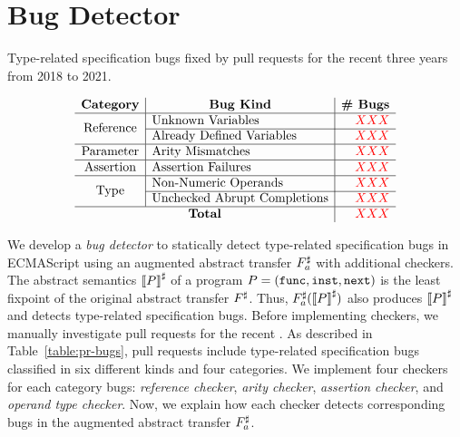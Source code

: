 \section{Bug Detector}\label{sec:checker}

\begin{table}
  \centering
  \caption{Type-related specification bugs fixed by pull requests for the recent
  three years from 2018 to 2021.}
  \label{table:pr-bugs}
  \vspace*{-1.5em}
  \[
    \begin{array}{c|l|r}
      \multicolumn{1}{c}{\textbf{Category}} &
      \multicolumn{1}{|c}{\textbf{Bug Kind}} &
      \multicolumn{1}{|c}{\textbf{\# Bugs}}\\
      \hline

      \multirow{2}{*}{\text{Reference}}
      & \text{Unknown Variables} & \inred{XXX}\\\cline{2-3}
      & \text{Already Defined Variables} & \inred{XXX}\\\hline

      \multirow{1}{*}{\text{Parameter}}
      & \text{Arity Mismatches} & \inred{XXX}\\\hline

      \multirow{1}{*}{\text{Assertion}}
      & \text{Assertion Failures} & \inred{XXX}\\\hline

      \multirow{2}{*}{\text{Type}}
      & \text{Non-Numeric Operands} & \inred{XXX}\\\cline{2-3}
      & \text{Unchecked Abrupt Completions} & \inred{XXX}\\\hline

      \multicolumn{2}{c|}{\textbf{Total}} & \inred{XXX}\\

    \end{array}
  \]
  \vspace*{-1.5em}
\end{table}

We develop a \textit{bug detector} to statically detect type-related
specification bugs in ECMAScript using an augmented abstract transfer
${F}^\sharp_a$ with additional checkers.  The abstract semantics ${\llbracket{P}\rrbracket}^\sharp$ of
a program $P = (\mathtt{func}, \mathtt{inst}, \mathtt{next})$ is the least fixpoint of the
original abstract transfer ${F}^\sharp$.  Thus, ${F}^\sharp_a({\llbracket{P}\rrbracket}^\sharp)$ also
produces ${\llbracket{P}\rrbracket}^\sharp$ and detects type-related specification bugs.  Before
implementing checkers, we manually investigate pull requests for the recent
.  As described in
Table~\ref{table:pr-bugs}, pull requests include  type-related
specification bugs classified in six different kinds and four categories.  We
implement four checkers for each category bugs: \textit{reference checker},
\textit{arity checker}, \textit{assertion checker}, and \textit{operand type
checker}.  Now, we explain how each checker detects corresponding bugs in the
augmented abstract transfer ${F}^\sharp_a$.


